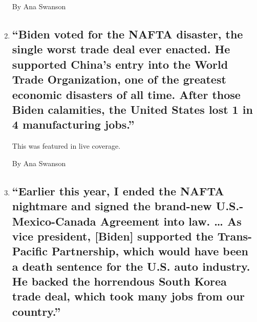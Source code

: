 \begin{enumerate}
  By Ana Swanson
\item
  \href{/live/2020/08/27/us/rnc-fact-check/biden-voted-for-the-nafta-disaster-the-single-worst-trade-deal-ever-enacted-he-supported-chinas-entry-into-the-world-trade-organ}{}

  \hypertarget{biden-voted-for-the-nafta-disaster-the-single-worst-trade-deal-ever-enacted-he-supported-chinas-entry-into-the-world-trade-organization-one-of-the-greatest-economic-disasters-of-all-time-after-those-biden-calamities-the-united-states-lost-1-in-4-manufacturing-jobs}{%
  \subsection{``Biden voted for the NAFTA disaster, the single worst
  trade deal ever enacted. He supported China's entry into the World
  Trade Organization, one of the greatest economic disasters of all
  time. After those Biden calamities, the United States lost 1 in 4
  manufacturing
  jobs.''}\label{biden-voted-for-the-nafta-disaster-the-single-worst-trade-deal-ever-enacted-he-supported-chinas-entry-into-the-world-trade-organization-one-of-the-greatest-economic-disasters-of-all-time-after-those-biden-calamities-the-united-states-lost-1-in-4-manufacturing-jobs}}

  This was featured in live coverage.

  By Ana Swanson
\item
  \href{/live/2020/08/27/us/rnc-fact-check/earlier-this-year-i-ended-the-nafta-nightmare-and-signed-the-brand-new-us-mexico-canada-agreement-into-law-as-vice-president-bid}{}

  \hypertarget{earlier-this-year-i-ended-the-nafta-nightmare-and-signed-the-brand-new-us-mexico-canada-agreement-into-law--as-vice-president-biden-supported-the-trans-pacific-partnership-which-would-have-been-a-death-sentence-for-the-us-auto-industry-he-backed-the-horrendous-south-korea-trade-deal-which-took-many-jobs-from-our-country}{%
  \subsection{``Earlier this year, I ended the NAFTA nightmare and
  signed the brand-new U.S.-Mexico-Canada Agreement into law. \ldots{}
  As vice president, {[}Biden{]} supported the Trans-Pacific
  Partnership, which would have been a death sentence for the U.S. auto
  industry. He backed the horrendous South Korea trade deal, which took
  many jobs from our
  country.''}\label{earlier-this-year-i-ended-the-nafta-nightmare-and-signed-the-brand-new-us-mexico-canada-agreement-into-law--as-vice-president-biden-supported-the-trans-pacific-partnership-which-would-have-been-a-death-sentence-for-the-us-auto-industry-he-backed-the-horrendous-south-korea-trade-deal-which-took-many-jobs-from-our-country}}


\end{enumerate}
